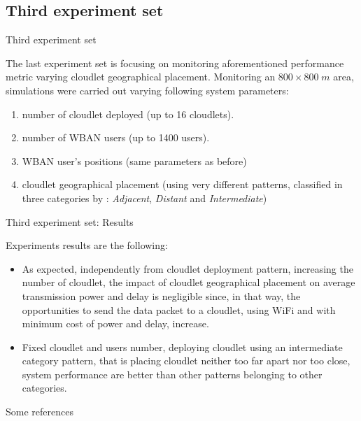 \documentclass[10pt]{beamer}
\begin{document}
\subsection{Third experiment set}
\begin{frame}{Third experiment set}

The last experiment set is focusing on monitoring aforementioned performance metric varying cloudlet geographical placement. Monitoring an $800 \times 800 \; m$ area, simulations were carried out varying following system parameters:

\begin{enumerate}
\item number of cloudlet deployed (up to 16 cloudlets).
\item number of WBAN users (up to 1400 users).
\item WBAN user's positions (same parameters as before)
\item cloudlet geographical placement (using very different patterns, classified in three categories by \citet{MSAReport}: \textit{Adjacent}, \textit{Distant} and \textit{Intermediate})
\end{enumerate}

\end{frame} 
\begin{frame}{Third experiment set: Results}

Experiments results are the following:

\begin{itemize}

\item As expected, independently from cloudlet deployment pattern, increasing the number of cloudlet, the impact of cloudlet geographical placement on average transmission power and delay is negligible since, in that way, the opportunities to send the data packet to a cloudlet, using WiFi and with minimum cost of power and delay, increase.

\item Fixed cloudlet and users number, deploying cloudlet using an intermediate category pattern, that is placing cloudlet neither too far apart nor too close, system performance are better than other patterns belonging to other categories.

\end{itemize}
\end{frame}


\begin{frame}[noframenumbering,shrink=15]{Some references}
\printbibliography
\end{frame}
\end{document}

